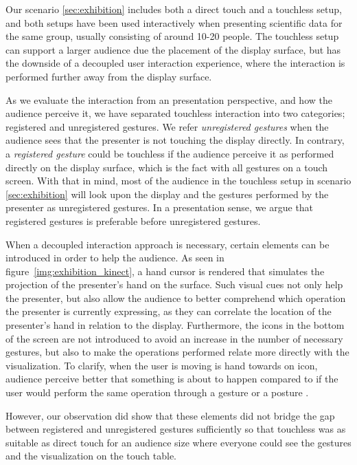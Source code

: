 \documentclass[review,journal]{vgtc}         %
\begin{document}
Our scenario \ref{sec:exhibition} includes both a direct touch and a touchless setup, and both setups have been used interactively when presenting scientific data for the same group, usually consisting of around 10-20 people.
The touchless setup can support a larger audience due the placement of the display surface, but has the downside of a decoupled user interaction experience, where the interaction is performed further away from the display surface.

As we evaluate the interaction from an presentation perspective, and how the audience perceive it, we have separated touchless interaction into two categories; registered and unregistered gestures.
We refer \emph{unregistered gestures} when the audience sees that the presenter is not touching the display directly. 
In contrary, a \emph{registered gesture} could be touchless if the audience perceive it as performed directly on the display surface, which is the fact with all gestures on a touch screen.
With that in mind, most of the audience in the touchless setup in scenario \ref{sec:exhibition} will look upon the display and the gestures performed by the presenter as unregistered gestures.
In a presentation sense, we argue that registered gestures is preferable before unregistered gestures.
 
When a decoupled interaction approach is necessary, certain elements can be introduced in order to help the audience.
As seen in figure~\ref{img:exhibition_kinect}, a hand cursor is rendered that simulates the projection of the presenter's hand on the surface.
Such visual cues not only help the presenter, but also allow the audience to better  comprehend which operation the presenter is currently expressing, as they can correlate the location of the presenter's hand in relation to the display.
Furthermore, the icons in the bottom of the screen are not introduced to avoid an increase in the number of necessary gestures, but also to make the operations performed relate more directly with the visualization. 
To clarify, when the user is moving is hand towards on icon, audience perceive better that something is about to happen compared to if the user would perform the same operation through a gesture or a posture \cite{isenberg:hal-00781237}.

However, our observation did show that these elements did not bridge the gap between registered and unregistered gestures sufficiently so that touchless was as suitable as direct touch for an audience size where everyone could see the gestures and the visualization on the touch table.
\end{document}

